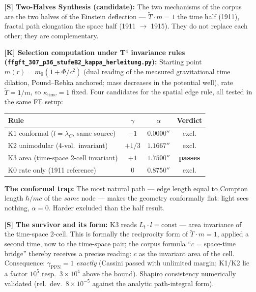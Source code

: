 \medskip
\textbf{[S] Two-Halves Synthesis (candidate):} The two mechanisms of
the corpus are the two halves of the Einstein deflection —
$\tilde T \cdot m = 1$ the time half (1911), fractal path elongation
the space half (1911 $\to$ 1915). They do not replace each other;
they are complementary.

\medskip
\textbf{[K] Selection computation under T$^4$ invariance rules
(\texttt{ffgft\_307\_p36\_stufeB2\_kappa\_herleitung.py}):}
Starting point $m(r) = m_0(1+\Phi/c^2)$ (dual reading of the measured
gravitational time dilation, Pound--Rebka anchored; mass decreases in
the potential well), rate $\tilde T = 1/m$, so $\kappa_\text{time} = 1$
fixed. Four candidates for the spatial edge rule, all tested in the same
FE setup:

\begin{center}
\begin{tabular}{lccc}
\toprule
Rule & $\gamma$ & $\alpha$ & Verdict\\
\midrule
K1 conformal ($l = \lambda_C$, same source) & $-1$ & $0.0000''$ & excl.\\
K2 unimodular (4-vol.\ invariant)           & $+1/3$ & $1.1667''$ & excl.\\
K3 area (time-space 2-cell invariant)       & $+1$ & $1.7500''$ & \textbf{passes}\\
K0 rate only (1911 reference)               & $0$ & $0.8750''$ & excl.\\
\bottomrule
\end{tabular}
\end{center}

\textbf{The conformal trap:} The most natural path — edge length equal
to Compton length $\hbar/mc$ of the \emph{same} node — makes the geometry
conformally flat: light sees nothing, $\alpha = 0$. Harder excluded than
the half result.

\medskip
\textbf{[S] The survivor and its form:} K3 reads
$L_t \cdot l = \text{const}$ — area invariance of the time-space 2-cell.
This is formally the reciprocity form of $\tilde T \cdot m = 1$, applied
a second time, now to the time-space pair; the corpus formula ``$c$ =
space-time bridge'' thereby receives a precise reading: $c$ as the
invariant area of the cell.
Consequence: $\gamma_\text{PPN} = 1$ \emph{exactly} (Cassini passed with
unlimited margin; K1/K2 lie a factor $10^5$ resp.\ $3\times10^4$ above the
bound). Shapiro consistency numerically validated (rel.\ dev.\ $8\times10^{-5}$
against the analytic path-integral form).

